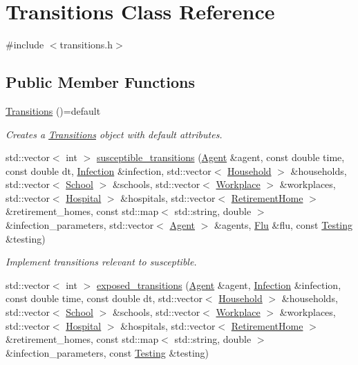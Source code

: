 \hypertarget{classTransitions}{}\section{Transitions Class Reference}
\label{classTransitions}


{\ttfamily \#include $<$transitions.\+h$>$}

\subsection*{Public Member Functions}
\begin{DoxyCompactItemize}
\item 
\hyperlink{classTransitions_a11c132ce29225616ff91901c544c35b4}{Transitions} ()=default
\begin{DoxyCompactList}\small\item\em Creates a \hyperlink{classTransitions}{Transitions} object with default attributes. \end{DoxyCompactList}\item 
std\+::vector$<$ int $>$ \hyperlink{classTransitions_a3c487bc7e6e586498bf3733ab372614a}{susceptible\+\_\+transitions} (\hyperlink{classAgent}{Agent} \&agent, const double time, const double dt, \hyperlink{classInfection}{Infection} \&infection, std\+::vector$<$ \hyperlink{classHousehold}{Household} $>$ \&households, std\+::vector$<$ \hyperlink{classSchool}{School} $>$ \&schools, std\+::vector$<$ \hyperlink{classWorkplace}{Workplace} $>$ \&workplaces, std\+::vector$<$ \hyperlink{classHospital}{Hospital} $>$ \&hospitals, std\+::vector$<$ \hyperlink{classRetirementHome}{Retirement\+Home} $>$ \&retirement\+\_\+homes, const std\+::map$<$ std\+::string, double $>$ \&infection\+\_\+parameters, std\+::vector$<$ \hyperlink{classAgent}{Agent} $>$ \&agents, \hyperlink{classFlu}{Flu} \&flu, const \hyperlink{classTesting}{Testing} \&testing)
\begin{DoxyCompactList}\small\item\em Implement transitions relevant to susceptible. \end{DoxyCompactList}\item 
std\+::vector$<$ int $>$ \hyperlink{classTransitions_a3dfcc686ebd4d77becae69ac993af380}{exposed\+\_\+transitions} (\hyperlink{classAgent}{Agent} \&agent, \hyperlink{classInfection}{Infection} \&infection, const double time, const double dt, std\+::vector$<$ \hyperlink{classHousehold}{Household} $>$ \&households, std\+::vector$<$ \hyperlink{classSchool}{School} $>$ \&schools, std\+::vector$<$ \hyperlink{classWorkplace}{Workplace} $>$ \&workplaces, std\+::vector$<$ \hyperlink{classHospital}{Hospital} $>$ \&hospitals, std\+::vector$<$ \hyperlink{classRetirementHome}{Retirement\+Home} $>$ \&retirement\+\_\+homes, const std\+::map$<$ std\+::string, double $>$ \&infection\+\_\+parameters, const \hyperlink{classTesting}{Testing} \&testing)

\end{DoxyCompactItemize}
